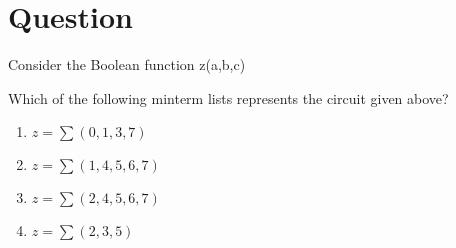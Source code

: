 \documentclass[journal,12pt,twocolumn]{IEEEtran}
\title{\mytitle}
\author{\myauthor\hspace{1em}\\\contact\\IITH\hspace{0.5em}-\hspace{0.6em}\mymodule}
\date{23-03-2023}
\begin{document}
%

\theoremstyle{definition}
\newtheorem{theorem}{Theorem}[section]
\newtheorem{problem}{Problem}
\newtheorem{proposition}{Proposition}[section]
\newtheorem{lemma}{Lemma}[section]
\newtheorem{corollary}[theorem]{Corollary}
\newtheorem{example}{Example}[section]
\newtheorem{definition}{Definition}[section]
\newcommand{\BEQA}{\begin{eqnarray}}
\newcommand{\EEQA}{\end{eqnarray}}
\newcommand{\define}{\stackrel{\triangle}{=}}

\vspace{3cm}
  \maketitle
  \tableofcontents

\section{Question}
        Consider the Boolean function z(a,b,c)
  Which of the following minterm lists represents the circuit given above?
\begin{enumerate}
\item $z=\sum(0,1,3,7)$
\item $z=\sum(1,4,5,6,7)$
\item $z=\sum(2,4,5,6,7)$
\item $z=\sum(2,3,5)$	
\end{enumerate}	
\end{document}
